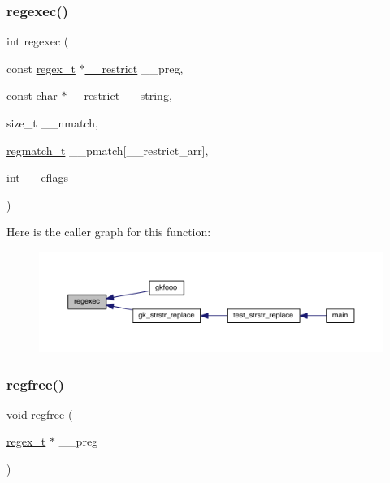 \subsubsection{\texorpdfstring{regexec()}{regexec()}}
{\footnotesize\ttfamily int regexec (\begin{DoxyParamCaption}\item[{const \hyperlink{a00092_a159f97bcead74ee31a0817571f7625a9}{regex\+\_\+t} $\ast$\hyperlink{a00092_a4127c12268159bf73f8e69b23c34c610}{\+\_\+\+\_\+restrict}}]{\+\_\+\+\_\+preg,  }\item[{const char $\ast$\hyperlink{a00092_a4127c12268159bf73f8e69b23c34c610}{\+\_\+\+\_\+restrict}}]{\+\_\+\+\_\+string,  }\item[{size\+\_\+t}]{\+\_\+\+\_\+nmatch,  }\item[{\hyperlink{a00694}{regmatch\+\_\+t}}]{\+\_\+\+\_\+pmatch\mbox{[}\+\_\+\+\_\+restrict\+\_\+arr\mbox{]},  }\item[{int}]{\+\_\+\+\_\+eflags }\end{DoxyParamCaption})}

Here is the caller graph for this function\+:\nopagebreak
\begin{figure}[H]
\begin{center}
\leavevmode
\includegraphics[width=350pt]{a00092_a179877eb45bb29da01e5101325554d73_icgraph}
\end{center}
\end{figure}
\mbox{\label{a00092_a87e79b6d048a32ffbfdb234c4166e769}} 
\subsubsection{\texorpdfstring{regfree()}{regfree()}}
{\footnotesize\ttfamily void regfree (\begin{DoxyParamCaption}\item[{\hyperlink{a00092_a159f97bcead74ee31a0817571f7625a9}{regex\+\_\+t} $\ast$}]{\+\_\+\+\_\+preg }\end{DoxyParamCaption})}

